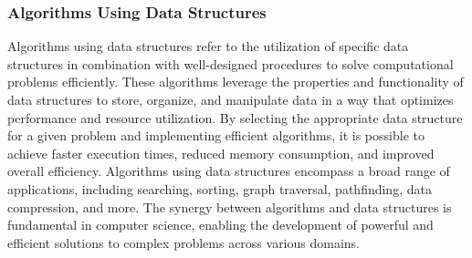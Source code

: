 \subsubsection*{Algorithms Using Data Structures}

Algorithms using data structures refer to the utilization of specific data structures in combination with well-designed procedures to solve computational problems efficiently. These algorithms leverage the properties and functionality of data structures to store, organize, and manipulate data in a way that optimizes performance and resource utilization. By selecting the appropriate data structure for a given problem and implementing efficient 
algorithms, it is possible to achieve faster execution times, reduced memory consumption, and improved overall efficiency. Algorithms using data structures encompass a broad range of applications, including searching, sorting, graph traversal, pathfinding, data compression, and more. The synergy between algorithms and data structures is fundamental in computer science, enabling the development of powerful and efficient solutions to complex 
problems across various domains.

